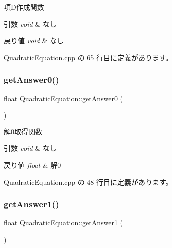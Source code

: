項\+D作成関数 


\begin{DoxyParams}{引数}
{\em void} & なし \\
\hline
\end{DoxyParams}

\begin{DoxyRetVals}{戻り値}
{\em void} & なし \\
\hline
\end{DoxyRetVals}


 Quadratic\+Equation.\+cpp の 65 行目に定義があります。

\mbox{\label{class_quadratic_equation_a50d11093835e2446dd99262413b39c1d}} 
\subsubsection{\texorpdfstring{get\+Answer0()}{getAnswer0()}}
{\footnotesize\ttfamily float Quadratic\+Equation\+::get\+Answer0 (\begin{DoxyParamCaption}{ }\end{DoxyParamCaption})}



解0取得関数 


\begin{DoxyParams}{引数}
{\em void} & なし \\
\hline
\end{DoxyParams}

\begin{DoxyRetVals}{戻り値}
{\em float} & 解0 \\
\hline
\end{DoxyRetVals}


 Quadratic\+Equation.\+cpp の 48 行目に定義があります。

\mbox{\label{class_quadratic_equation_ac40c9d76e2995d2c1319672ad81f8f60}} 
\subsubsection{\texorpdfstring{get\+Answer1()}{getAnswer1()}}
{\footnotesize\ttfamily float Quadratic\+Equation\+::get\+Answer1 (\begin{DoxyParamCaption}{ }\end{DoxyParamCaption})}



